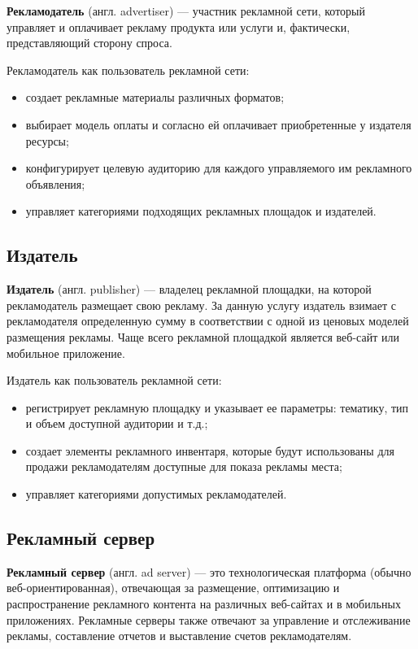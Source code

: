 \documentclass[times]{itmo-student-thesis}
\begin{document}
\textbf{Рекламодатель} (англ. advertiser) — участник рекламной сети, который управляет и оплачивает рекламу продукта или услуги и, фактически, представляющий сторону спроса. 

Рекламодатель как пользователь рекламной сети:
\begin{itemize}
\item создает рекламные материалы различных форматов;
\item выбирает модель оплаты и согласно ей оплачивает приобретенные у издателя ресурсы;
\item конфигурирует целевую аудиторию для каждого управляемого им рекламного объявления;
\item управляет категориями подходящих рекламных площадок и издателей.
\end{itemize}

\subsection{Издатель}

\textbf{Издатель} (англ. publisher) — владелец рекламной площадки, на которой рекламодатель размещает свою рекламу. За данную услугу издатель взимает с рекламодателя определенную сумму в соответствии с одной из ценовых моделей размещения рекламы. Чаще всего рекламной площадкой является веб-сайт или мобильное приложение.

Издатель как пользователь рекламной сети:
\begin{itemize}
\item регистрирует рекламную площадку и указывает ее параметры: тематику, тип и объем доступной аудитории и т.д.;
\item создает элементы рекламного инвентаря, которые будут использованы для продажи рекламодателям доступные для показа рекламы места;
\item управляет категориями допустимых рекламодателей.
\end{itemize}

\subsection{Рекламный сервер}

\textbf{Рекламный сервер} (англ. ad server) \cite{ad-server} — это технологическая платформа (обычно веб-ориентированная), отвечающая за размещение, оптимизацию и распространение рекламного контента на различных веб-сайтах и в мобильных приложениях. Рекламные серверы также отвечают за управление и отслеживание рекламы, составление отчетов и выставление счетов рекламодателям.
\end{document}
